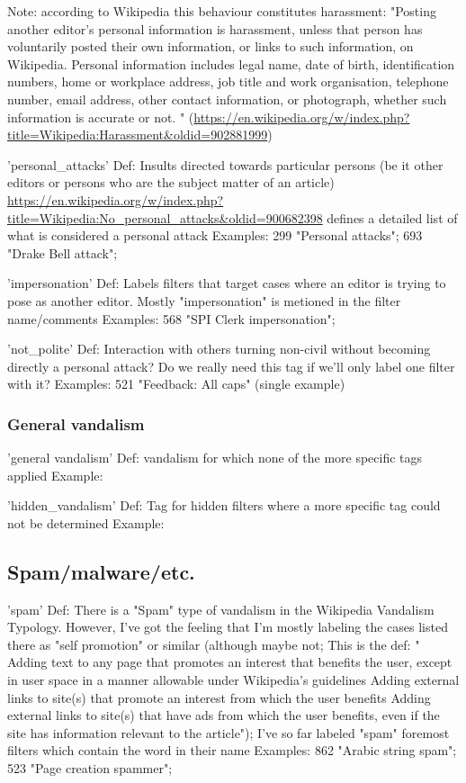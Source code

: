 Note: according to Wikipedia this behaviour constitutes harassment: "Posting another editor's personal information is harassment, unless that person has voluntarily posted their own information, or links to such information, on Wikipedia. Personal information includes legal name, date of birth, identification numbers, home or workplace address, job title and work organisation, telephone number, email address, other contact information, or photograph, whether such information is accurate or not. " (\url{https://en.wikipedia.org/w/index.php?title=Wikipedia:Harassment&oldid=902881999})

'personal\_attacks'
  Def: Insults directed towards particular persons (be it other editors or persons who are the subject matter of an article)
  \url{https://en.wikipedia.org/w/index.php?title=Wikipedia:No_personal_attacks&oldid=900682398} defines a detailed list of what is considered a personal attack
  Examples: 299 "Personal attacks"; 693 "Drake Bell attack";

'impersonation'
  Def: Labels filters that target cases where an editor is trying to pose as another editor. Mostly "impersonation" is metioned in the filter name/comments
  Examples: 568 "SPI Clerk impersonation";

'not\_polite'
  Def: Interaction with others turning non-civil without becoming directly a personal attack? Do we really need this tag if we'll only label one filter with it?
  Examples: 521 "Feedback: All caps" (single example)

\subsubsection{General vandalism}

'general vandalism'
 Def: vandalism for which none of the more specific tags applied
 Example:

'hidden\_vandalism'
 Def: Tag for hidden filters where a more specific tag could not be determined
 Example:

\subsection{Spam/malware/etc.}

'spam'
  Def: There is a "Spam" type of vandalism in the Wikipedia Vandalism Typology. However, I've got the feeling that I'm mostly labeling the cases listed there as "self promotion" or similar (although maybe not; This is the def: "    Adding text to any page that promotes an interest that benefits the user, except in user space in a manner allowable under Wikipedia's guidelines
    Adding external links to site(s) that promote an interest from which the user benefits
    Adding external links to site(s) that have ads from which the user benefits, even if the site has information relevant to the article");
  I've so far labeled "spam" foremost filters which contain the word in their name
  Examples: 862 "Arabic string spam";  523 "Page creation spammer";


